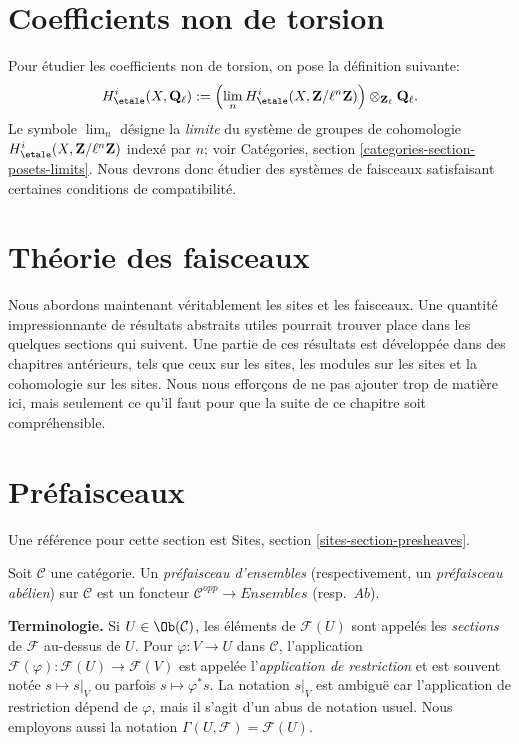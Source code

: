 \section{Coefficients non de torsion}
\label{section-nontorsion}

\noindent
Pour \'etudier les coefficients non de torsion, on pose la d\'efinition suivante:
$$
H_\etale^i (X, \mathbf{Q}_\ell) :=
\left( \lim_n H_\etale^i(X, \mathbf{Z}/\ell^n\mathbf{Z}) \right)
\otimes_{\mathbf{Z}_\ell} \mathbf{Q}_\ell.
$$
Le symbole $\lim_n$ d\'esigne la {\it limite} du syst\`eme de groupes de
cohomologie $H_\etale^i(X, \mathbf{Z}/\ell^n\mathbf{Z})$ index\'e par $n$; voir
Cat\'egories, section \ref{categories-section-posets-limits}.
Nous devrons donc \'etudier des syst\`emes de faisceaux satisfaisant certaines
conditions de compatibilit\'e.




\section{Th\'eorie des faisceaux}
\label{section-sheaf-theory}

\noindent
Nous abordons maintenant v\'eritablement les sites et les faisceaux.
Une quantit\'e impressionnante de r\'esultats abstraits utiles pourrait trouver place
dans les quelques sections qui suivent. Une partie de ces r\'esultats est d\'evelopp\'ee dans des
chapitres ant\'erieurs, tels que ceux sur les sites, les modules sur les sites et la cohomologie
sur les sites. Nous nous effor\c{c}ons de ne pas ajouter trop de mati\`ere ici, mais seulement
ce qu'il faut pour que la suite de ce chapitre soit compr\'ehensible.




\section{Pr\'efaisceaux}
\label{section-presheaves}

\noindent
Une r\'ef\'erence pour cette section est
Sites, section \ref{sites-section-presheaves}.

\begin{definition}
\label{definition-presheaf}
Soit $\mathcal{C}$ une cat\'egorie. Un {\it pr\'efaisceau d'ensembles} (respectivement, un
{\it pr\'efaisceau ab\'elien}) sur $\mathcal{C}$ est un foncteur $\mathcal{C}^{opp} \to
\textit{Ensembles}$ (resp.\ $\textit{Ab}$).
\end{definition}

\noindent
{\bf Terminologie.} Si $U \in \Ob(\mathcal{C})$, les \'el\'ements de
$\mathcal{F}(U)$ sont appel\'es les {\it sections} de $\mathcal{F}$ au-dessus de
$U$. Pour $\varphi : V \to U$ dans $\mathcal{C}$, l'application
$\mathcal{F}(\varphi) : \mathcal{F}(U) \to \mathcal{F}(V)$
est appel\'ee l'{\it application de restriction} et est souvent not\'ee $s \mapsto s|_V$
ou parfois $s \mapsto \varphi^*s$. La notation $s|_V$ est ambigu\"e
car l'application de restriction d\'epend de $\varphi$, mais il s'agit d'un abus
de notation usuel. Nous employons aussi la notation
$\Gamma(U, \mathcal{F}) = \mathcal{F}(U)$.

